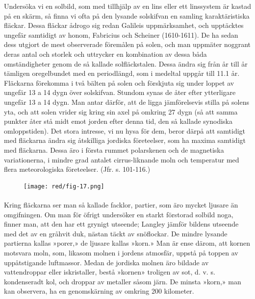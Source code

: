 \documentclass[a4paper, 12pt, oneside, swedish]{article}
\begin{document}
Undersöka vi en solbild, som med tillhjälp av en lins eller ett linssystem är kastad på en skärm, så finna vi ofta på den lysande solskifvan en samling karaktäristiska fläckar. Dessa fläckar ådrogo sig redan Galileis uppmärksamhet, och upptäcktes ungefär samtidigt av honom, Fabricius och Scheiner (1610-1611). De ha sedan dess utgjort de mest observerade föremålen på solen, och man uppmäter noggrant deras antal och storlek och uttrycker en kombination av dessa båda omständigheter genom de så kallade solfläckstalen. Dessa ändra sig från år till år tämligen oregelbundet med en periodlängd, som i medeltal uppgår till 11.1 år. Fläckarna förekomma i två bälten på solen och förskjuta sig under loppet av ungefär 13 a 14 dygn över solskifvan. Stundom synas de åter efter ytterligare ungefär 13 a 14 dygn. Man antar därför, att de ligga jämförelsevis stilla på solens yta, och att solen vrider sig kring sin axel på omkring 27 dygn (så att samma punkter åter stå midt emot jorden efter denna tid, den så kallade synodiska omloppstiden). Det stora intresse, vi nu hysa för dem, beror därpå att samtidigt med fläckarna ändra sig åtskilliga jordiska företeelser, som ha maxima samtidigt med fläckarna. Dessa äro i första rummet polarskenen och de magnetiska variationerna, i mindre grad antalet cirrus-liknande moln och temperatur med flera meteorologiska företeelser. (Jfr. s. 101-116.)

\begin{figure}[H]
\centering
\texttt{[image: red/fig-17.png]}
\caption{}
\end{figure}
\paragraph{}
Kring fläckarna ser man så kallade facklor, partier, som äro mycket ljusare än omgifningen. Om man för öfrigt undersöker en starkt förstorad solbild noga, finner man, att den har ett grynigt utseende; Langley jämför bildens utseende med det av en gråhvit duk, nästan täckt av snöflockar. De mindre lysande partierna kallas »porer,» de ljusare kallas »korn.» Man är ense därom, att kornen motsvara moln, som, likasom molnen i jordens atmosfär, uppstå på toppen av uppåtstigande luftmassor. Medan de jordiska molnen äro bildade av vattendroppar eller iskristaller, bestå »kornen» troligen av sot, d. v. s. kondenseradt kol, och droppar av metaller såsom järn. De minsta »korn,» man kan observera, ha en genomskärning av omkring 200 kilometer.
\end{document}
